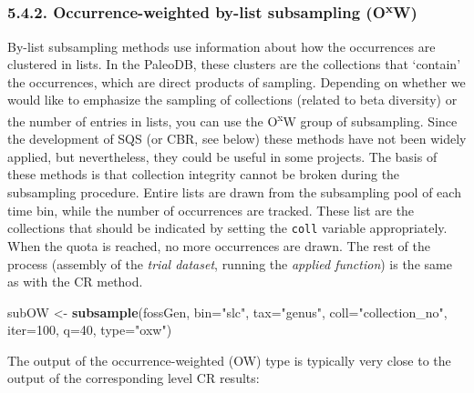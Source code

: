 \documentclass[]{article}
\newenvironment{Shaded}{\begin{snugshade}}{\end{snugshade}}
\newcommand{\DataTypeTok}[1]{\textcolor[rgb]{0.13,0.29,0.53}{#1}}
\newcommand{\DecValTok}[1]{\textcolor[rgb]{0.00,0.00,0.81}{#1}}
\newcommand{\KeywordTok}[1]{\textcolor[rgb]{0.13,0.29,0.53}{\textbf{#1}}}
\newcommand{\NormalTok}[1]{#1}
\newcommand{\StringTok}[1]{\textcolor[rgb]{0.31,0.60,0.02}{#1}}
\begin{document}
\hypertarget{occurrence-weighted-by-list-subsampling-oxw}{%
\subsubsection{\texorpdfstring{5.4.2. Occurrence-weighted by-list
subsampling
(O\textsuperscript{x}W)}{5.4.2. Occurrence-weighted by-list subsampling (OxW)}}\label{occurrence-weighted-by-list-subsampling-oxw}}

By-list subsampling methods use information about how the occurrences
are clustered in lists. In the PaleoDB, these clusters are the
collections that `contain' the occurrences, which are direct products of
sampling. Depending on whether we would like to emphasize the sampling
of collections (related to beta diversity) or the number of entries in
lists, you can use the O\textsuperscript{x}W group of subsampling. Since
the development of SQS (or CBR, see below) these methods have not been
widely applied, but nevertheless, they could be useful in some projects.
The basis of these methods is that collection integrity cannot be broken
during the subsampling procedure. Entire lists are drawn from the
subsampling pool of each time bin, while the number of occurrences are
tracked. These list are the collections that should be indicated by
setting the \texttt{coll} variable appropriately. When the quota is
reached, no more occurrences are drawn. The rest of the process
(assembly of the \emph{trial dataset}, running the \emph{applied
function}) is the same as with the CR method.

\begin{Shaded}
\begin{Highlighting}[]
\NormalTok{subOW <-}\StringTok{ }\KeywordTok{subsample}\NormalTok{(fossGen, }\DataTypeTok{bin=}\StringTok{"slc"}\NormalTok{, }\DataTypeTok{tax=}\StringTok{"genus"}\NormalTok{, }\DataTypeTok{coll=}\StringTok{"collection_no"}\NormalTok{,}
  \DataTypeTok{iter=}\DecValTok{100}\NormalTok{, }\DataTypeTok{q=}\DecValTok{40}\NormalTok{, }\DataTypeTok{type=}\StringTok{"oxw"}\NormalTok{)}
\end{Highlighting}
\end{Shaded}

The output of the occurrence-weighted (OW) type is typically very close
to the output of the corresponding level CR results:
\end{document}
